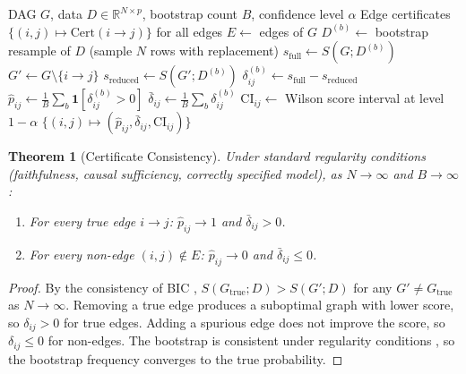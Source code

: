 \documentclass[11pt,a4paper]{article}
\newtheorem{theorem}{Theorem}
\begin{document}
\begin{algorithm}[t]
\caption{Bootstrap Edge Certificate Computation}
\label{alg:certificate}
\begin{algorithmic}[1]
\REQUIRE DAG $G$, data $D \in \mathbb{R}^{N \times p}$, bootstrap count $B$, confidence level $\alpha$
\ENSURE Edge certificates $\{(i,j) \mapsto \text{Cert}(i \to j)\}$ for all edges
\STATE $E \gets$ edges of $G$
    \STATE $D^{(b)} \gets$ bootstrap resample of $D$ (sample $N$ rows with replacement)
    \STATE $s_{\text{full}} \gets S(G; D^{(b)})$
        \STATE $G' \gets G \setminus \{i \to j\}$
        \STATE $s_{\text{reduced}} \gets S(G'; D^{(b)})$
        \STATE $\delta_{ij}^{(b)} \gets s_{\text{full}} - s_{\text{reduced}}$
    \ENDFOR
\ENDFOR
{}
    \STATE $\hat{p}_{ij} \gets \frac{1}{B} \sum_b \mathbf{1}[\delta_{ij}^{(b)} > 0]$
    \STATE $\bar{\delta}_{ij} \gets \frac{1}{B} \sum_b \delta_{ij}^{(b)}$
    \STATE $\text{CI}_{ij} \gets$ Wilson score interval at level $1 - \alpha$
\ENDFOR
\RETURN $\{(i,j) \mapsto (\hat{p}_{ij}, \bar{\delta}_{ij}, \text{CI}_{ij})\}$
\end{algorithmic}
\end{algorithm}

\begin{theorem}[Certificate Consistency]
\label{thm:cert-consistency}
Under standard regularity conditions (faithfulness, causal sufficiency, correctly specified model), as $N \to \infty$ and $B \to \infty$:
\begin{enumerate}
    \item For every true edge $i \to j$: $\hat{p}_{ij} \to 1$ and $\bar{\delta}_{ij} > 0$.
    \item For every non-edge $(i, j) \notin E$: $\hat{p}_{ij} \to 0$ and $\bar{\delta}_{ij} \leq 0$.
\end{enumerate}
\end{theorem}

\begin{proof}
By the consistency of BIC \citep{schwarz1978estimating}, $S(G_{\text{true}}; D) > S(G'; D)$ for any $G' \neq G_{\text{true}}$ as $N \to \infty$. Removing a true edge produces a suboptimal graph with lower score, so $\delta_{ij} > 0$ for true edges. Adding a spurious edge does not improve the score, so $\delta_{ij} \leq 0$ for non-edges. The bootstrap is consistent under regularity conditions \citep{efron1994introduction}, so the bootstrap frequency converges to the true probability.
\end{proof}
\end{document}

